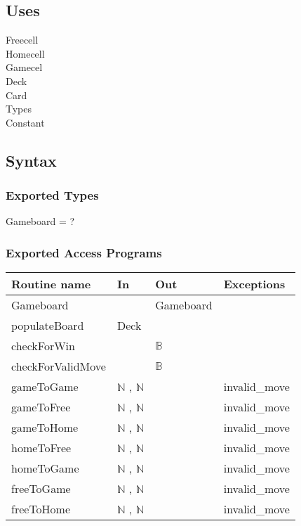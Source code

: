 \documentclass[12pt]{article}
\begin{document}
\subsection* {Uses}

Freecell\\
Homecell\\
Gamecel\\
Deck\\
Card\\
Types\\
Constant\

\subsection* {Syntax}

\subsubsection* {Exported Types}

Gameboard = ? 

\subsubsection* {Exported Access Programs}

\begin{tabular}{| l | l | l | l |}
	\hline
	\textbf{Routine name} & \textbf{In} & \textbf{Out} & \textbf{Exceptions}\\
	\hline
	Gameboard & ~ & Gameboard & \\
	\hline
	populateBoard & Deck & ~ &~\\
	\hline
	checkForWin & ~ & $\mathbb{B}$ & ~\\
	\hline
	checkForValidMove & ~ & $\mathbb{B}$ & ~\\
	\hline
	gameToGame &  $\mathbb{N}$ , $\mathbb{N}$  & ~ & invalid\_move\\
	\hline
	gameToFree &  $\mathbb{N}$ , $\mathbb{N}$  & ~ & invalid\_move\\
	\hline
	gameToHome &  $\mathbb{N}$ , $\mathbb{N}$  & ~ & invalid\_move\\
	\hline
	homeToFree &  $\mathbb{N}$ , $\mathbb{N}$  & ~ & invalid\_move\\
	\hline
	homeToGame &  $\mathbb{N}$ , $\mathbb{N}$  & ~ & invalid\_move\\
	\hline	
	freeToGame &  $\mathbb{N}$ , $\mathbb{N}$  & ~ & invalid\_move\\
	\hline
	freeToHome &  $\mathbb{N}$ , $\mathbb{N}$  & ~ & invalid\_move\\
	\hline
\end{tabular}
\end{document}
